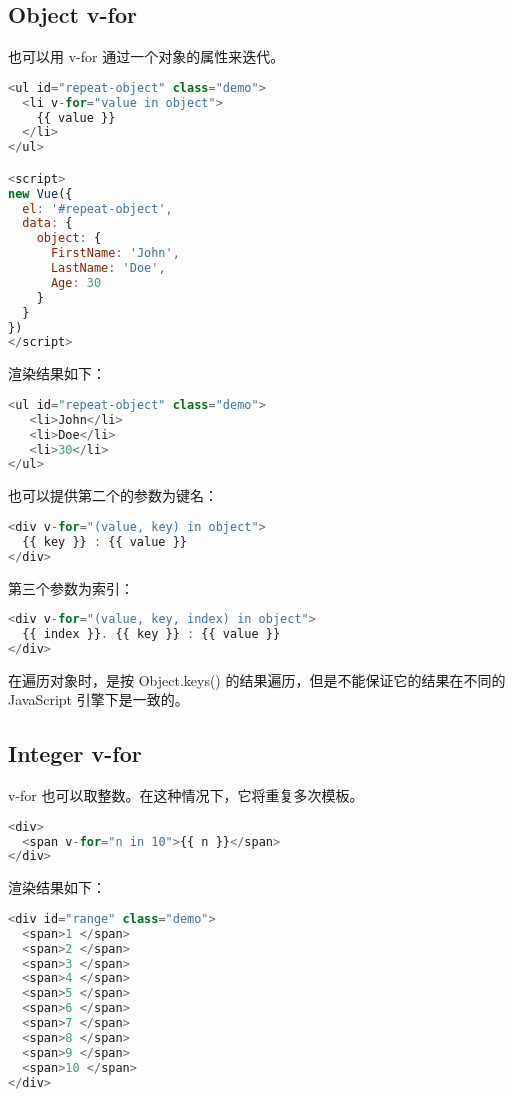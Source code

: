 \subsection{Object v-for}

也可以用 v-for 通过一个对象的属性来迭代。


\begin{lstlisting}[language=JavaScript]
<ul id="repeat-object" class="demo">
  <li v-for="value in object">
    {{ value }}
  </li>
</ul>

<script>
new Vue({
  el: '#repeat-object',
  data: {
    object: {
      FirstName: 'John',
      LastName: 'Doe',
      Age: 30
    }
  }
})
</script>
\end{lstlisting}

渲染结果如下：

\begin{lstlisting}[language=JavaScript]
<ul id="repeat-object" class="demo">
   <li>John</li>
   <li>Doe</li>
   <li>30</li>
</ul>
\end{lstlisting}

也可以提供第二个的参数为键名：


\begin{lstlisting}[language=JavaScript]
<div v-for="(value, key) in object">
  {{ key }} : {{ value }}
</div>
\end{lstlisting}

第三个参数为索引：

\begin{lstlisting}[language=JavaScript]
<div v-for="(value, key, index) in object">
  {{ index }}. {{ key }} : {{ value }}
</div>
\end{lstlisting}

在遍历对象时，是按 Object.keys() 的结果遍历，但是不能保证它的结果在不同的 JavaScript 引擎下是一致的。

\subsection{Integer v-for}

v-for 也可以取整数。在这种情况下，它将重复多次模板。


\begin{lstlisting}[language=JavaScript]
<div>
  <span v-for="n in 10">{{ n }}</span>
</div>
\end{lstlisting}



渲染结果如下：


\begin{lstlisting}[language=JavaScript]
<div id="range" class="demo">
  <span>1 </span>
  <span>2 </span>
  <span>3 </span>
  <span>4 </span>
  <span>5 </span>
  <span>6 </span>
  <span>7 </span>
  <span>8 </span>
  <span>9 </span>
  <span>10 </span>
</div>
\end{lstlisting}

